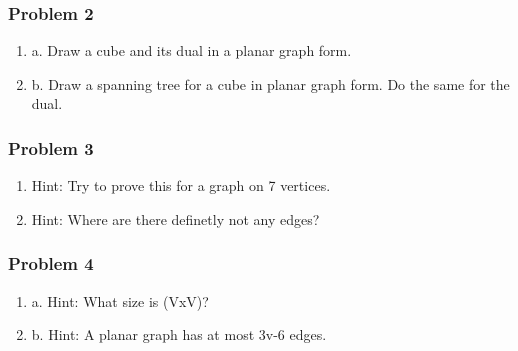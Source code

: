 \documentclass{beamer}
\begin{document}
\begin{frame}
    \frametitle{Problem 2}
    \begin{enumerate}[<+->]
        \item a. Draw a cube and its dual in a planar graph form.
        \item b. Draw a spanning tree for a cube in planar graph form. Do the same for the dual.
    \end{enumerate}
\end{frame}

\begin{frame}
    \frametitle{Problem 3}
    \begin{enumerate}[<+->]
        \item Hint: Try to prove this for a graph on 7 vertices.
        \item Hint: Where are there definetly not any edges?
    \end{enumerate}
\end{frame}

\begin{frame}
    \frametitle{Problem 4}
    \begin{enumerate}[<+->]
        \item a. Hint: What size is (VxV)?
        \item b. Hint: A planar graph has at most 3v-6 edges.
    \end{enumerate}
\end{frame}
\end{document}
